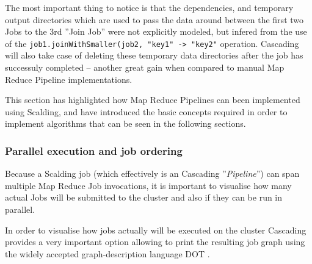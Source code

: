 The most important thing to notice is that the dependencies, and temporary output directories which are used to pass the data around between the first two Jobs to the 3rd ''Join Job'' were not explicitly modeled, but infered from the use of the \verb|job1.joinWithSmaller(job2, "key1" -> "key2"| operation. Cascading will also take case of deleting these temporary data directories after the job has successuly completed -- another great gain when compared to manual Map Reduce Pipeline implementations.

This section has highlighted how Map Reduce Pipelines can been implemented using Scalding, and have introduced the basic concepts required in order to implement algorithms that can be seen in the following sections.



\subsubsection{Parallel execution and job ordering}
Because a Scalding job (which effectively is an Cascading ''\textit{Pipeline}'') can span multiple Map Reduce Job invocations,
it is important to visualise how many actual Jobs will be submitted to the cluster and also if they can be run in parallel.

In order to visualise how jobs actually will be executed on the cluster Cascading provides a very important option allowing to print the resulting job graph using the widely accepted graph-description language DOT \cite{dot}.

